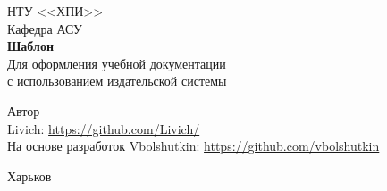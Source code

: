 
  \begin{center}
    НТУ <<ХПИ>>\\
    Кафедра АСУ\\
    \vfill
    {\Large \bf Шаблон}\\
    {\Large Для оформления учебной документации}\\
    {\Large с использованием издательской системы \XeLaTeX}\\
  \end{center}
\vfill
\hfill
  \begin{minipage}[t]{80mm}\flushleft
    Автор\\
    Livich: \url{https://github.com/Livich/}\\
    На основе разработок Vbolshutkin: \url{https://github.com/vbolshutkin}
  \end{minipage}
\vspace{10mm}
\vfill
\begin{center}Харьков \the\year\end{center}
\thispagestyle{empty}
\newpage
